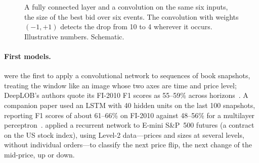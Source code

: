 \begin{figure}[!htbp]
\centering
{}
\caption{A fully connected layer and a convolution on the same six inputs, the size of the best bid over six
events. The convolution with weights $(-1, +1)$ detects the drop from 10 to 4 wherever it occurs. Illustrative
numbers. Schematic.}
\label{fig:conv-vs-fc}
\end{figure}

\paragraph{First models.} \citet{tsantekidis2017} were the first to apply a convolutional network to sequences of book
snapshots, treating the window like an image whose two axes are time and price level; DeepLOB's authors quote its
FI-2010 F1 scores as 55--59\% across horizons~\citep{zhang2019}. A
companion paper used an LSTM with 40 hidden units on the last 100 snapshots, reporting F1 scores
of about 61--66\% on FI-2010 against 48--56\% for a multilayer perceptron~\citep{tsantekidis2017lstm}.
\citet{dixon2018} applied a recurrent network to E-mini S\&P~500 futures (a contract on the US stock index), using
Level-2 data---prices and sizes at several levels, without individual orders---to classify the next price flip, the
next change of the mid-price, up or down.

